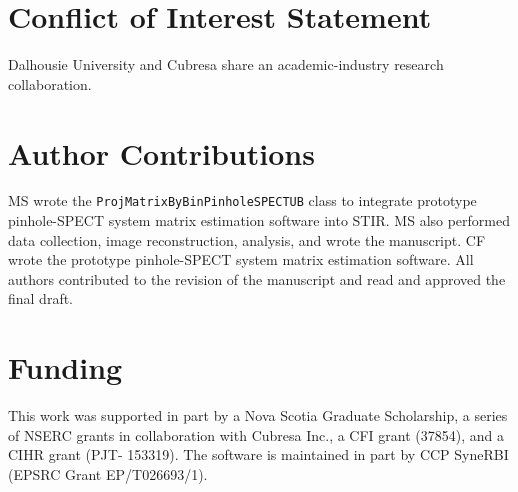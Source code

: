 \documentclass[utf8]{FrontiersinVancouver}
\begin{document}

\section*{Conflict of Interest Statement}
Dalhousie University and Cubresa share an academic-industry research collaboration.



\section*{Author Contributions}
MS wrote the \texttt{ProjMatrixByBinPinholeSPECTUB} class to integrate prototype pinhole-SPECT system matrix estimation software into STIR. MS also performed data collection, image reconstruction, analysis, and wrote the manuscript. CF wrote the prototype pinhole-SPECT system matrix estimation software. All authors contributed to the revision of the manuscript and read and approved the final draft.


\section*{Funding}
This work was supported in part by a Nova Scotia Graduate Scholarship, a series of NSERC grants in collaboration with Cubresa Inc., a CFI grant (37854), and a CIHR grant (PJT- 153319). The software is maintained in part by CCP SyneRBI (EPSRC Grant EP/T026693/1). 
\end{document}
